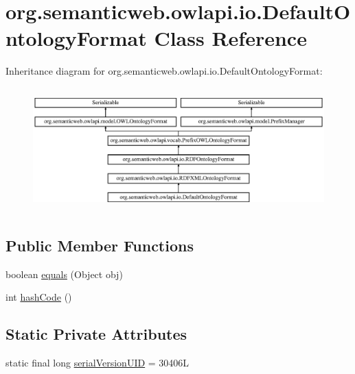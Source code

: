 \hypertarget{classorg_1_1semanticweb_1_1owlapi_1_1io_1_1_default_ontology_format}{\section{org.\-semanticweb.\-owlapi.\-io.\-Default\-Ontology\-Format Class Reference}
\label{classorg_1_1semanticweb_1_1owlapi_1_1io_1_1_default_ontology_format}
}
Inheritance diagram for org.\-semanticweb.\-owlapi.\-io.\-Default\-Ontology\-Format\-:\begin{figure}[H]
\begin{center}
\leavevmode
\includegraphics[height=4.813753cm]{classorg_1_1semanticweb_1_1owlapi_1_1io_1_1_default_ontology_format}
\end{center}
\end{figure}
\subsection*{Public Member Functions}
\begin{DoxyCompactItemize}
\item 
boolean \hyperlink{classorg_1_1semanticweb_1_1owlapi_1_1io_1_1_default_ontology_format_ad59da185cfa7e3bf24842473a45da723}{equals} (Object obj)
\item 
int \hyperlink{classorg_1_1semanticweb_1_1owlapi_1_1io_1_1_default_ontology_format_ad493b9cf78367d8b2c46709130af170d}{hash\-Code} ()
\end{DoxyCompactItemize}
\subsection*{Static Private Attributes}
\begin{DoxyCompactItemize}
\item 
static final long \hyperlink{classorg_1_1semanticweb_1_1owlapi_1_1io_1_1_default_ontology_format_a678f15adcdfdbf468cc0dd9600c4eb8f}{serial\-Version\-U\-I\-D} = 30406\-L
\end{DoxyCompactItemize}

